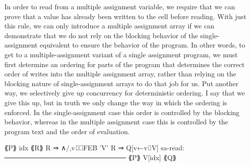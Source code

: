 In order to read from a multiple assignment variable, we 
require that we can prove that a value has already been written to the 
cell before reading. With just this rule, we can only introduce a 
multiple assignment array if we can demonstrate that we do not rely on the 
blocking behavior of the single-assignment equivalent to ensure the behavior 
of the program. In other words, to get to a multiple-assignment variant of 
a single assignment program, we must first determine an ordering for 
parts of the program that determines the correct order of writes into 
the multiple assignment array, rather than relying on the blocking nature 
of single-assignment arrays to do that job for us. Put another way, 
we selectively give up concurrency for deterministic ordering. I say that 
we give this up, but in truth we only change the way in which the ordering is 
enforced. In the single-assignment case this order is controlled by the 
blocking behavior, whereas in the multiple assignment case this is controlled 
by the program text and the order of evaluation.

         ⟪P⟫ idx ⟪R⟫
         R ⇒ ∧/,v⌷⎕FEB 'V'
         R ⇒ Q[v←v⌷V]
sa-read: ─────────────────────────
         ⟪P⟫ V[idx] ⟪Q⟫

